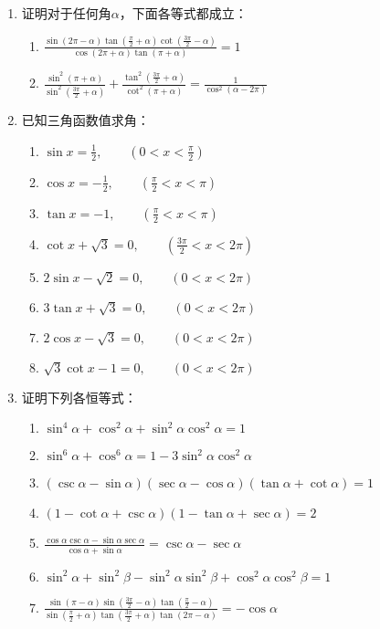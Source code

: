 \begin{enumerate}
\item 证明对于任何角$\alpha$，下面各等式都成立：
\begin{enumerate}
    \item $\frac{\sin(2\pi-\alpha)\tan\left(\frac{\pi}{2}+\alpha\right)\cot\left(\frac{3\pi}{2}-\alpha\right)}{\cos(2\pi+\alpha)\tan(\pi+\alpha)}=1$
    \item $\frac{\sin^2(\pi+\alpha)}{\sin^2\left(\frac{3\pi}{2}+\alpha\right)}+\frac{\tan^2\left(\frac{3\pi}{2}+\alpha\right)}{\cot^2(\pi+\alpha)}=\frac{1}{\cos^2(\alpha-2\pi)}$
\end{enumerate}

\item 已知三角函数值求角：
\begin{enumerate}
    \item $\sin x=\frac{1}{2},\qquad \left(0<x<\frac{\pi}{2}\right)$
    \item $\cos x=-\frac{1}{2},\qquad \left(\frac{\pi}{2}<x<{\pi}\right)$
    \item $\tan x=-1,\qquad \left(\frac{\pi}{2}<x<\pi\right)$
    \item $\cot x+\sqrt{3}=0,\qquad \left(\frac{3\pi}{2}<x<2\pi\right)$
    \item $2\sin x-\sqrt{2}=0,\qquad (0<x<2\pi)$
    \item $3\tan x+\sqrt{3}=0,\qquad (0<x<2\pi)$
    \item $2\cos x-\sqrt{3}=0,\qquad (0<x<2\pi)$
    \item $\sqrt{3}\cot x-1=0,\qquad (0<x<2\pi)$
\end{enumerate}

\item 证明下列各恒等式：
\begin{enumerate}
    \item $\sin ^{4} \alpha+\cos ^{2} \alpha+\sin ^{2} \alpha \cos ^{2} \alpha=1$
    \item $\sin ^{6} \alpha+\cos ^{6} \alpha=1-3 \sin ^{2} \alpha \cos ^{2} \alpha$
    \item $(\csc \alpha-\sin \alpha)(\sec \alpha-\cos \alpha)(\tan \alpha+\cot  \alpha)=1$
    \item $(1-\cot  \alpha+\csc \alpha)(1-\tan \alpha+\sec \alpha)=2$
    \item $\frac{\cos \alpha \csc \alpha-\sin \alpha \sec \alpha}{\cos \alpha+\sin \alpha}=\csc \alpha-\sec \alpha$
    \item $\sin ^{2} \alpha+\sin ^{2} \beta-\sin ^{2} \alpha \sin ^{2} \beta+\cos ^{2} \alpha \cos ^{2} \beta=1$
    \item $\frac{\sin (\pi-\alpha) \sin \left(\frac{3 \pi}{2}-\alpha\right) \tan\left(\frac{\pi}{2}-\alpha\right)}{\sin \left(\frac{\pi}{2}+\alpha\right) \tan\left(\frac{3 \pi}{2}+\alpha\right) \tan(2 \pi-\alpha)} 
=-\cos \alpha$


\end{enumerate}
\end{enumerate}
